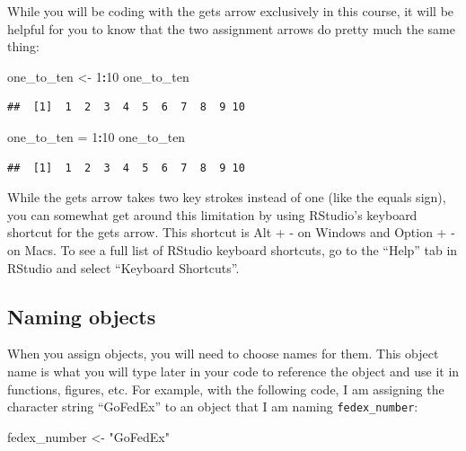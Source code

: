 \documentclass[]{book}
\makeatletter
\newenvironment{Shaded}{\begin{snugshade}}{\end{snugshade}}
\newcommand{\DecValTok}[1]{\textcolor[rgb]{0.00,0.00,0.81}{#1}}
\newcommand{\StringTok}[1]{\textcolor[rgb]{0.31,0.60,0.02}{#1}}
\newcommand{\OperatorTok}[1]{\textcolor[rgb]{0.81,0.36,0.00}{\textbf{#1}}}
\newcommand{\NormalTok}[1]{#1}
\newenvironment{kframe}{%
\medskip{}
\setlength{\fboxsep}{.8em}
 \def\at@end@of@kframe{}%
 \ifinner\ifhmode%
  \def\at@end@of@kframe{\end{minipage}}%
  \begin{minipage}{\columnwidth}%
 \fi\fi%
 \def\FrameCommand##1{\hskip\@totalleftmargin \hskip-\fboxsep
 \colorbox{shadecolor}{##1}\hskip-\fboxsep
     \hskip-\linewidth \hskip-\@totalleftmargin \hskip\columnwidth}%
 \MakeFramed {\advance\hsize-\width
   \@totalleftmargin\z@ \linewidth\hsize
   \@setminipage}}%
 {\par\unskip\endMakeFramed%
 \at@end@of@kframe}
\renewenvironment{Shaded}{\begin{kframe}}{\end{kframe}}
\theoremstyle{definition}
\theoremstyle{definition}
\theoremstyle{definition}
\theoremstyle{remark}
\makeatother
\begin{document}
While you will be coding with the gets arrow exclusively in this course,
it will be helpful for you to know that the two assignment arrows do
pretty much the same thing:

\begin{Shaded}
\begin{Highlighting}[]
\NormalTok{one_to_ten <-}\StringTok{ }\DecValTok{1}\OperatorTok{:}\DecValTok{10}
\NormalTok{one_to_ten}
\end{Highlighting}
\end{Shaded}

\begin{verbatim}
##  [1]  1  2  3  4  5  6  7  8  9 10
\end{verbatim}

\begin{Shaded}
\begin{Highlighting}[]
\NormalTok{one_to_ten =}\StringTok{ }\DecValTok{1}\OperatorTok{:}\DecValTok{10}
\NormalTok{one_to_ten}
\end{Highlighting}
\end{Shaded}

\begin{verbatim}
##  [1]  1  2  3  4  5  6  7  8  9 10
\end{verbatim}

While the gets arrow takes two key strokes instead of one (like the
equals sign), you can somewhat get around this limitation by using
RStudio's keyboard shortcut for the gets arrow. This shortcut is Alt + -
on Windows and Option + - on Macs. To see a full list of RStudio
keyboard shortcuts, go to the ``Help'' tab in RStudio and select
``Keyboard Shortcuts''.

\subsection{Naming objects}\label{naming-objects}

When you assign objects, you will need to choose names for them. This
object name is what you will type later in your code to reference the
object and use it in functions, figures, etc. For example, with the
following code, I am assigning the character string ``GoFedEx'' to an
object that I am naming \texttt{fedex\_number}:

\begin{Shaded}
\begin{Highlighting}[]
\NormalTok{fedex_number <-}\StringTok{ "GoFedEx"}
\end{Highlighting}
\end{Shaded}
\end{document}

